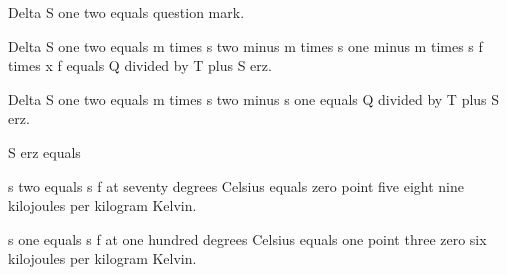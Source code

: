 Delta S one two equals question mark.  

Delta S one two equals m times s two minus m times s one minus m times s f times x f equals Q divided by T plus S erz.  

Delta S one two equals m times s two minus s one equals Q divided by T plus S erz.  

S erz equals  

s two equals s f at seventy degrees Celsius equals zero point five eight nine kilojoules per kilogram Kelvin.  

s one equals s f at one hundred degrees Celsius equals one point three zero six kilojoules per kilogram Kelvin.